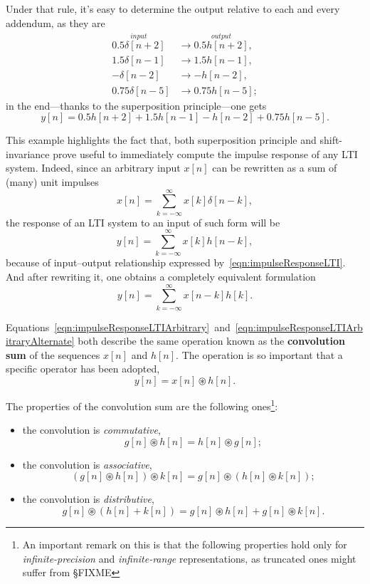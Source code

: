 \documentclass[\documentfontsize, twocolumn]{\classname}
\begin{document}
Under that rule, it's easy to determine the output relative to each and every addendum, as they are
\begin{align*}
    \overset{input}{0.5\delta[n+2]} & \longrightarrow \overset{output}{0.5h[n+2]},\\
    1.5\delta[n-1] & \longrightarrow 1.5h[n-1],\\
    -\delta[n-2] & \longrightarrow -h[n-2],\\
    0.75\delta[n-5] & \longrightarrow 0.75h[n-5];
\end{align*}
in the end---thanks to the superposition principle---one gets
\[
    y[n] = 0.5h[n+2] + 1.5h[n-1] - h[n-2] + 0.75h[n-5].
\]

This example highlights the fact that, both superposition principle and shift-invariance prove useful to immediately compute the impulse response of any LTI system. Indeed, since an arbitrary input $x[n]$ can be rewritten as a sum of (many) unit impulses
\begin{equation}\label{eqn:inputAsSumOfImpulses}
    x[n] = \sum_{k=-\infty}^\infty x[k] \delta[n-k],
\end{equation}
the response of an LTI system to an input of such form will be
\begin{equation}\label{eqn:impulseResponseLTIArbitrary}
    y[n] = \sum_{k=-\infty}^\infty x[k] h[n-k],
\end{equation}
because of input--output relationship expressed by~\ref{eqn:impulseResponseLTI}. And after rewriting it, one obtains a completely equivalent formulation
\begin{equation}\label{eqn:impulseResponseLTIArbitraryAlternate}
    y[n] = \sum_{k=-\infty}^\infty x[n-k] h[k].
\end{equation}

Equations~\ref{eqn:impulseResponseLTIArbitrary}~and~\ref{eqn:impulseResponseLTIArbitraryAlternate} both describe the same operation known as the \textbf{convolution sum} of the sequences $x[n]$ and $h[n]$. The operation is so important that a specific operator has been adopted,
\begin{equation}\label{eqn:convolutionSum}
    y[n] = x[n] \circledast h[n].
\end{equation}

The properties of the convolution sum are the following ones\footnote{An important remark on this is that the following properties hold only for \emph{infinite-precision} and \emph{infinite-range} representations, as truncated ones might suffer from §FIXME}:
\begin{itemize}
    \item the convolution is \emph{commutative},\[ g[n] \circledast h[n] = h[n] \circledast g[n];\]
    \item the convolution is \emph{associative},\[ (g[n] \circledast h[n]) \circledast k[n] = g[n] \circledast (h[n] \circledast k[n]);\]
    \item the convolution is \emph{distributive},\[ g[n] \circledast (h[n] + k[n]) = g[n] \circledast h[n] + g[n] \circledast k[n].\]
\end{itemize}
\end{document}
